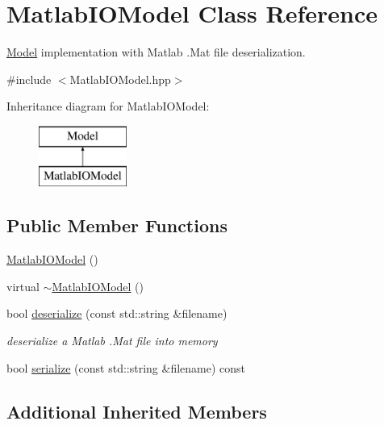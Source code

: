 \hypertarget{classMatlabIOModel}{\section{Matlab\-I\-O\-Model Class Reference}
\label{classMatlabIOModel}
}


\hyperlink{classModel}{Model} implementation with Matlab .Mat file deserialization.  




{\ttfamily \#include $<$Matlab\-I\-O\-Model.\-hpp$>$}

Inheritance diagram for Matlab\-I\-O\-Model\-:\begin{figure}[H]
\begin{center}
\leavevmode
\includegraphics[height=2.000000cm]{classMatlabIOModel}
\end{center}
\end{figure}
\subsection*{Public Member Functions}
\begin{DoxyCompactItemize}
\item 
\hyperlink{classMatlabIOModel_ac4e387c6665a094f985b0ca0c37b1aee}{Matlab\-I\-O\-Model} ()
\item 
virtual \hyperlink{classMatlabIOModel_ac47ddec68b26241297c266b248c856d6}{$\sim$\-Matlab\-I\-O\-Model} ()
\item 
bool \hyperlink{classMatlabIOModel_a223538821bf7944a26433f7f99017f8b}{deserialize} (const std\-::string \&filename)
\begin{DoxyCompactList}\small\item\em deserialize a Matlab .Mat file into memory \end{DoxyCompactList}\item 
bool \hyperlink{classMatlabIOModel_ad67a1237af4a4e4d736599e6f2474252}{serialize} (const std\-::string \&filename) const 
\end{DoxyCompactItemize}
\subsection*{Additional Inherited Members}


